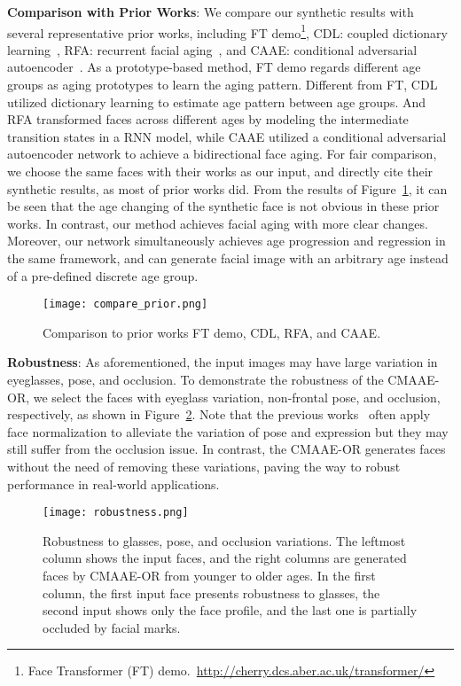 \documentclass{article}
\begin{document}
{\bf\noindent Comparison with Prior Works}:
We compare our synthetic results with several representative prior works, including FT demo\footnote{Face Transformer (FT) demo.~\url{http://cherry.dcs.aber.ac.uk/transformer/}}, CDL: coupled dictionary learning~\cite{shu2015personalized}, RFA: recurrent facial aging~\cite{wang2016recurrent}, and CAAE: conditional adversarial autoencoder~\cite{zhang2017age}. As a prototype-based method, FT demo regards different age groups as aging prototypes to learn the aging pattern. Different from FT,  CDL utilized dictionary learning to estimate age pattern between age groups. And RFA transformed faces across different ages by modeling the intermediate transition states in a RNN model, while CAAE utilized a conditional adversarial autoencoder network to achieve a bidirectional face aging. For fair comparison, we choose the same faces with their works as our input, and directly cite their synthetic results, as most of prior works did. From the results of Figure~\ref{compare_prior}, it can be seen that the age changing of the synthetic face is not obvious in these prior works. In contrast, our method achieves facial aging with more clear changes. Moreover, our network simultaneously achieves age progression and regression in the same framework, and can generate facial image with an arbitrary age instead of a pre-defined discrete age group.

\begin{figure}[!ht]
\centering
\texttt{[image: compare\_prior.png]}
\caption{Comparison to prior works FT demo, CDL, RFA, and CAAE.}
\label{compare_prior}
\end{figure}

{\bf\noindent Robustness}:
As aforementioned, the input images may have large variation in eyeglasses, pose, and occlusion. To demonstrate the robustness of the CMAAE-OR, we select the faces with eyeglass variation, non-frontal pose, and occlusion, respectively, as shown in Figure~\ref{robustness}. Note that the previous works~\cite{wang2016recurrent,kemelmacher2014illumination} often apply face normalization to alleviate the variation of pose and expression but they may still suffer from the occlusion issue. In contrast, the CMAAE-OR generates faces without the need of removing these variations, paving the way to robust performance in real-world applications.
\begin{figure}[!ht]
\centering
\texttt{[image: robustness.png]}
\caption{Robustness to glasses, pose, and occlusion variations. The leftmost column shows the input faces, and the right columns are generated faces by CMAAE-OR from younger to older ages. In the first column, the first input face presents robustness to glasses, the second input shows only the face profile, and the last one is partially occluded by facial marks.
}
\label{robustness}
\end{figure}
\end{document}
